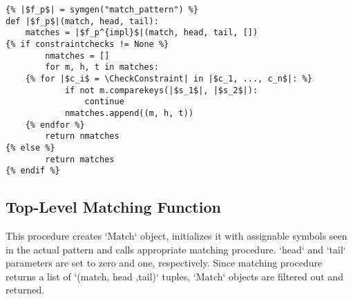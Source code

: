 \begin{verbatim}
{% |$f_p$| = symgen("match_pattern") %}
def |$f_p$|(match, head, tail):
	matches = |$f_p^{impl}$|(match, head, tail, [])
{% if constraintchecks != None %}
		nmatches = []
		for m, h, t in matches:
	{% for |$c_i$ = \CheckConstraint| in |$c_1, ..., c_n$|: %}
			if not m.comparekeys(|$s_1$|, |$s_2$|):
				continue
			nmatches.append((m, h, t))
	{% endfor %}
		return nmatches
{% else %}
		return matches
{% endif %}
\end{verbatim} 

\subsection{Top-Level Matching Function}

This procedure creates `Match` object, initializes it with assignable symbols seen in the actual pattern and calls appropriate matching procedure. `head` and `tail` parameters are set to zero and one, respectively. Since matching procedure returns a list of `(match, head ,tail)` tuples, `Match` objects are filtered out and returned.

